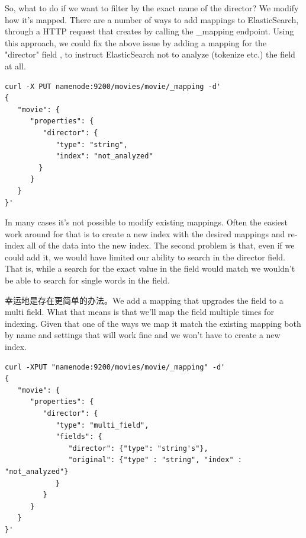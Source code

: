 \par So, what to do if we want to filter by the exact name of the director? We modify how it's mapped. There are a number of ways to add mappings to ElasticSearch, through a HTTP request that creates by calling the \_mapping endpoint. Using this approach, we could fix the above issue by adding a mapping for the "director" field , to instruct ElasticSearch not to analyze (tokenize etc.) the field at all.
\begin{verbatim}
curl -X PUT namenode:9200/movies/movie/_mapping -d'
{
   "movie": {
      "properties": {
         "director": {
            "type": "string",
            "index": "not_analyzed"
        }
      }
   }
}'
\end{verbatim}
\par In many cases it's not possible to modify existing mappings. Often the easiest work around for that is to create a new index with the desired mappings and re-index all of the data into the new index. The second problem is that, even if we could add it, we would have limited our ability to search in the director field. That is, while a search for the exact value in the field would match we wouldn't be able to search for single words in the field.
\par 幸运地是存在更简单的办法。We add a mapping that upgrades the field to a multi field. What that means is that we'll map the field multiple times for indexing. Given that one of the ways we map it match the existing mapping both by name and settings that will work fine and we won't have to create a new index.
\begin{verbatim}
curl -XPUT "namenode:9200/movies/movie/_mapping" -d'
{
   "movie": {
      "properties": {
         "director": {
            "type": "multi_field",
            "fields": {
               "director": {"type": "string's"},
               "original": {"type" : "string", "index" : "not_analyzed"}
            }
         }
      }
   }
}'
\end{verbatim}

